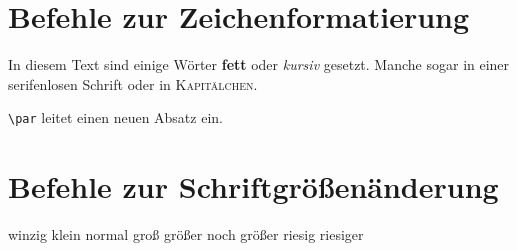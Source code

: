 \documentclass{article}
\begin{document}
\section{Befehle zur Zeichenformatierung}
In diesem Text sind einige Wörter \textbf{fett} oder \textit{kursiv} gesetzt. Manche sogar in einer \textsf{serifenlosen Schrift} oder in \textsc{Kapitälchen}. \par \texttt{\textbackslash par} leitet einen neuen Absatz ein.

\section{Befehle zur Schriftgrößenänderung}

\tiny winzig \small klein \normalsize normal \large groß \Large größer \LARGE noch größer \huge riesig \Huge  riesiger
\end{document}
